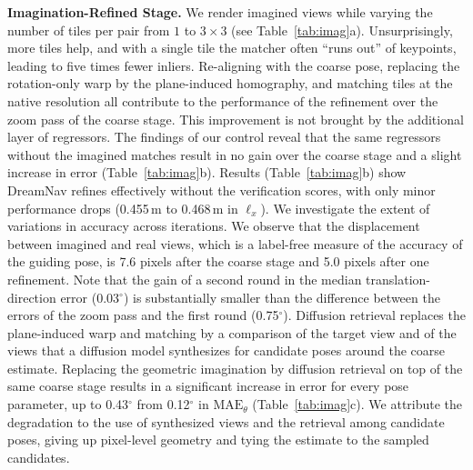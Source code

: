\noindent \textbf{Imagination-Refined Stage.} We render imagined views while varying the number of tiles per pair from $1$ to $3{\times}3$ (see Table~\ref{tab:imag}a). Unsurprisingly, more tiles help, and with a single tile the matcher often ``runs out'' of keypoints, leading to five times fewer inliers. Re-aligning with the coarse pose, replacing the rotation-only warp by the plane-induced homography, and matching tiles at the native resolution all contribute to the performance of the refinement over the zoom pass of the coarse stage. This improvement is not brought by the additional layer of regressors. The findings of our control reveal that the same regressors without the imagined matches result in no gain over the coarse stage and a slight increase in error (Table~\ref{tab:imag}b). Results (Table~\ref{tab:imag}b) show DreamNav refines effectively without the verification scores, with only minor performance drops (0.455\,m to 0.468\,m in $\ell_x$). We investigate the extent of variations in accuracy across iterations. We observe that the displacement between imagined and real views, which is a label-free measure of the accuracy of the guiding pose, is 7.6 pixels after the coarse stage and 5.0 pixels after one refinement. Note that the gain of a second round in the median translation-direction error (0.03$^\circ$) is substantially smaller than the difference between the errors of the zoom pass and the first round (0.75$^\circ$). Diffusion retrieval replaces the plane-induced warp and matching by a comparison of the target view and of the views that a diffusion model synthesizes for candidate poses around the coarse estimate. Replacing the geometric imagination by diffusion retrieval on top of the same coarse stage results in a significant increase in error for every pose parameter, up to 0.43$^\circ$ from 0.12$^\circ$ in $\mathrm{MAE}_\theta$ (Table~\ref{tab:imag}c). We attribute the degradation to the use of synthesized views and the retrieval among candidate poses, giving up pixel-level geometry and tying the estimate to the sampled candidates.

